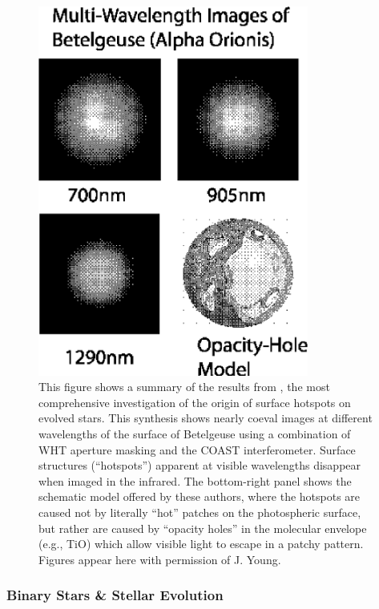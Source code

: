 \documentclass[12pt]{article}
\begin{document}
\begin{figure}[tbhp]
\begin{center}
\includegraphics[clip,angle=0,width=3.5in]{Figures/JDM_greybetelgeuse.eps}
\caption{\footnotesize This figure shows a summary of the results from
  \citet{young2000b}, the most comprehensive investigation of the
  origin of surface hotspots on evolved stars.  This synthesis
  shows nearly coeval images at different wavelengths of the surface
  of Betelgeuse using a combination of WHT aperture masking and the
  COAST interferometer.  Surface structures (``hotspots'') apparent at
  visible wavelengths disappear when imaged in the infrared.  The
  bottom-right panel shows the schematic model offered by these
  authors, where the hotspots are caused not by literally ``hot''
  patches on the photospheric surface, but rather are caused by
  ``opacity holes'' in the molecular envelope (e.g., TiO) which allow
  visible light to escape in a patchy pattern.  Figures appear here with
  permission of J. Young.
\label{betelgeuse}}
\end{center}
\end{figure}
   


\subsubsection{Binary Stars \& Stellar Evolution}
\end{document}

